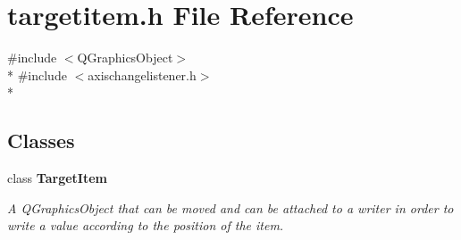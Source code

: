 \section{targetitem.\+h File Reference}
\label{items_2targetitem_8h}
{\ttfamily \#include $<$Q\+Graphics\+Object$>$}\\*
{\ttfamily \#include $<$axischangelistener.\+h$>$}\\*
\subsection*{Classes}
\begin{DoxyCompactItemize}
\item 
class {\bf Target\+Item}
\begin{DoxyCompactList}\small\item\em A Q\+Graphics\+Object that can be moved and can be attached to a writer in order to write a value according to the position of the item. \end{DoxyCompactList}\end{DoxyCompactItemize}
